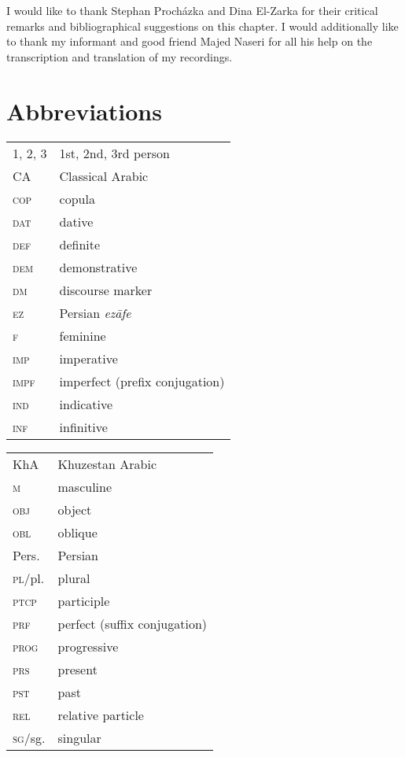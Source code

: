 \documentclass[output=paper,nonflat]{langsci/langscibook}
\begin{document}
I would like to thank Stephan Procházka and Dina El-Zarka for their critical remarks and bibliographical suggestions on this chapter. I would additionally like to thank my informant and good friend Majed Naseri for all his help on the transcription and translation of my recordings.

\section*{Abbreviations}

\begin{tabularx}{.55\textwidth}{@{}lQ@{}}
\textsc{1, 2, 3} & 1st, 2nd, 3rd person \\
CA & Classical Arabic\\
\textsc{cop} & {copula}\\
\textsc{dat} & dative\\
\textsc{def} & {definite}\\
\textsc{dem} & demonstrative\\
\textsc{dm} & discourse marker\\
\textsc{ez} & Persian \textit{ezāfe}\\
\textsc{f} & feminine\\
\textsc{imp} & imperative\\
\textsc{impf} & imperfect (prefix conjugation)\\
\textsc{ind} & indicative\\
\textsc{inf} & {infinitive}\\
\end{tabularx}%
\begin{tabularx}{.5\textwidth}{@{}lQ@{}}
KhA & Khuzestan Arabic\\
\textsc{m} & masculine\\
\textsc{obj} & object\\
\textsc{obl} & oblique\\
Pers. & Persian\\
\textsc{pl}/pl. & plural\\
\textsc{ptcp} & {participle}\\
\textsc{prf} & perfect (suffix conjugation)\\
\textsc{prog} & progressive\\
\textsc{prs} & present\\
\textsc{pst} & past\\
\textsc{rel} & {relative} particle\\
\textsc{sg}/sg. & singular\\
\end{tabularx}%




\sloppy\printbibliography[heading=subbibliography,notkeyword=this]
\end{document}
